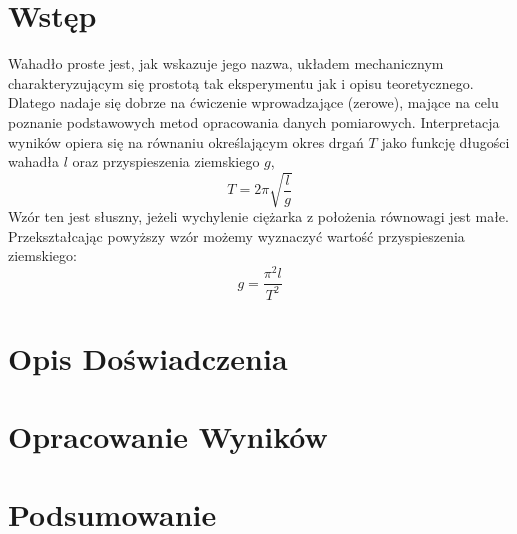 \documentclass{fizraport}
\begin{document}
\maketitle

\section{Wstęp}
Wahadło proste jest, jak wskazuje jego nazwa, układem mechanicznym charakteryzującym się prostotą tak  eksperymentu  jak  i  opisu  teoretycznego.
Dlatego nadaje  się dobrze  na ćwiczenie  wprowadzające (zerowe),   mające   na   celu   poznanie   podstawowych   metod   opracowania danych   pomiarowych.
Interpretacja  wyników  opiera  się na  równaniu  określającym  okres  drgań $T$ jako  funkcję długości wahadła $l$ oraz przyspieszenia ziemskiego $g$, 
%
\[ T = 2\pi \sqrt{\frac{l}{g}} \]
%
Wzór ten jest słuszny, jeżeli wychylenie ciężarka z położenia równowagi jest małe.  
Przekształcając powyższy wzór możemy wyznaczyć wartość przyspieszenia ziemskiego:
%
\[ g = \frac{\pi^2l}{T^2} \]
\vfill

\pagebreak
\section{Opis Doświadczenia}

\pagebreak
\section{Opracowanie Wyników}
\newpage
\section{Podsumowanie}
\newpage
\end{document}
